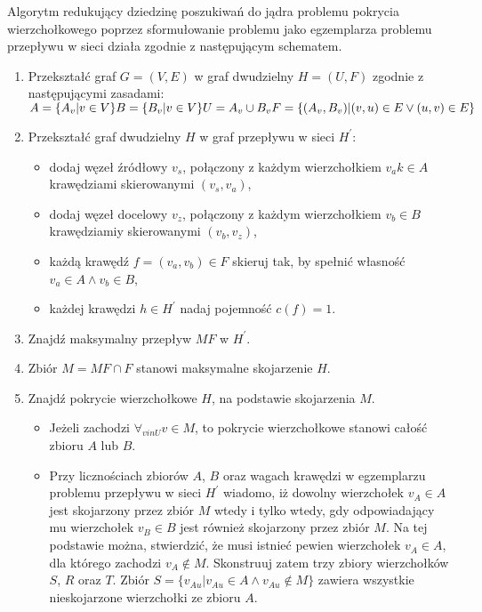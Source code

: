 Algorytm redukujący dziedzinę poszukiwań do jądra problemu pokrycia wierzchołkowego poprzez sformułowanie problemu jako egzemplarza problemu przepływu w sieci działa zgodnie z następującym schematem.
\begin{enumerate}
  \item Przekształć graf $G=(V,E)$ w graf dwudzielny $H=(U,F)$ zgodnie z
    następującymi zasadami:\\
    $A=\{A_v|v \in V\}\\
    B=\{B_v|v \in V\}\\
    U=A_v \cup B_v
    F=\{(A_v, B_v)|(v,u) \in E \lor (u,v) \in E\}$
  \item Przekształć graf dwudzielny $H$ w graf przepływu w sieci $H^\prime$:
    \begin{itemize}
      \item dodaj węzeł źródłowy $v_s$, połączony z każdym wierzchołkiem $v_a
        k\in A$ krawędziami skierowanymi $(v_s, v_a)$,
      \item dodaj węzeł docelowy $v_z$, połączony z każdym wierzchołkiem $v_b
        \in B$ krawędziamiy skierowanymi $(v_b, v_z)$,
      \item każdą krawędź $f=(v_a, v_b) \in F$ skieruj tak, by spełnić własność $v_a \in A \land v_b \in B$,
      \item każdej krawędzi $h \in H^\prime$ nadaj pojemność $c(f)=1$.
    \end{itemize}
  \item Znajdź maksymalny przepływ $MF$ w $H^\prime$.
  \item Zbiór $M=MF \cap F$ stanowi maksymalne skojarzenie $H$.
  \item Znajdź pokrycie wierzchołkowe $H$, na podstawie skojarzenia $M$.
    \begin{itemize}
      \item Jeżeli zachodzi $\forall_{v in U}{v \in M}$, to pokrycie wierzchołkowe stanowi całość zbioru $A$ lub $B$.
      \item Przy licznościach zbiorów $A$, $B$ oraz wagach krawędzi w egzemplarzu problemu przepływu w sieci $H^\prime$
        wiadomo, iż dowolny wierzchołek $v_A \in A$ jest skojarzony przez zbiór $M$ wtedy i tylko wtedy, gdy odpowiadający mu wierzchołek $v_B \in B$ jest również skojarzony przez zbiór $M$.
        Na tej podstawie można, stwierdzić, że musi istnieć pewien wierzchołek $v_A \in A$, dla którego zachodzi $v_A \notin M$.
        Skonstruuj zatem trzy zbiory wierzchołków $S$, $R$ oraz $T$.
        Zbiór $S = \{v_{Au}|v_{Au} \in A \land v_{Au} \notin M\}$ zawiera wszystkie nieskojarzone wierzchołki ze zbioru $A$.

\end{itemize}
\end{enumerate}
